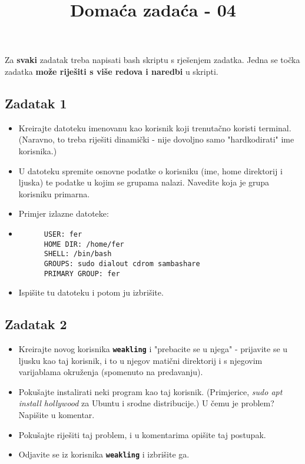 \documentclass[12pt,a4paper]{article}
\newcommand{\shell}[1]{\texttt{\textbf{#1}}}
\begin{document}
  \title{Domaća zadaća - 04\vspace{-2em}}
  \maketitle
  Za \textbf{svaki} zadatak treba napisati bash skriptu s rješenjem zadatka. Jedna se točka zadatka \textbf{može riješiti s više redova i naredbi} u skripti. \\

  \subsection*{Zadatak 1}
    \begin{itemize}
      \item Kreirajte datoteku imenovanu kao korisnik koji trenutačno koristi terminal. (Naravno, to treba riješiti dinamički - nije dovoljno samo "hardkodirati" ime korisnika.)
      \item U datoteku spremite osnovne podatke o korisniku (ime, home direktorij i ljuska) te podatke u kojim se grupama nalazi. Navedite koja je grupa korisniku primarna.
      \item[] Primjer izlazne datoteke:
      \item[] \begin{verbatim}
      USER: fer
      HOME DIR: /home/fer
      SHELL: /bin/bash
      GROUPS: sudo dialout cdrom sambashare
      PRIMARY GROUP: fer
      \end{verbatim}
      \item Ispišite tu datoteku i potom ju izbrišite.
    \end{itemize}

  \subsection*{Zadatak 2}
    \begin{itemize}
      \item Kreirajte novog korisnika \shell{weakling} i "prebacite se u njega" - prijavite se u ljusku kao taj korisnik, i to u njegov matični direktorij i s njegovim varijablama okruženja (spomenuto na predavanju).
      \item Pokušajte instalirati neki program kao taj korisnik. (Primjerice, \textit{sudo apt install hollywood} za Ubuntu i srodne distribucije.) U čemu je problem? Napišite u komentar.
      \item Pokušajte riješiti taj problem, i u komentarima opišite taj postupak.
      \item Odjavite se iz korisnika \shell{weakling} i izbrišite ga.
    \end{itemize}
\end{document}
